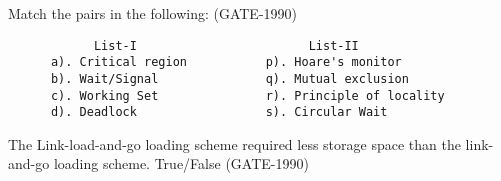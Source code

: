 
\begin{questyle}

  \question Match the pairs in the following: (GATE-1990)

  \begin{lstlisting}
            List-I                        List-II
      a). Critical region           p). Hoare's monitor
      b). Wait/Signal               q). Mutual exclusion
      c). Working Set               r). Principle of locality
      d). Deadlock                  s). Circular Wait

  \end{lstlisting}


\end{questyle}


\begin{questyle}

  \question  The Link-load-and-go loading scheme required less storage space than the link-and-go loading scheme. True/False (GATE-1990)

\end{questyle}












